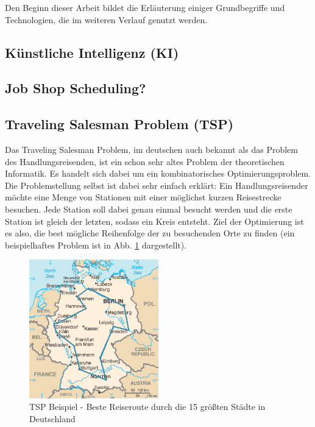 Den Beginn dieser Arbeit bildet die Erläuterung einiger Grundbegriffe und Technologien, die im weiteren Verlauf genutzt werden.

\subsection{Künstliche Intelligenz (KI)}
\label{section:ki}


\subsection{Job Shop Scheduling?}

\subsection{Traveling Salesman Problem (TSP)}
\label{sec:grundlagen_tsp}

Das Traveling Salesman Problem, im deutschen auch bekannt als das Problem des Handlungsreisenden, ist ein schon sehr altes Problem der theoretischen Informatik. Es handelt sich dabei um ein kombinatorisches Optimierungsproblem. Die Problemstellung selbst ist dabei sehr einfach erklärt: Ein Handlungsreisender möchte eine Menge von Stationen mit einer möglichst kurzen Reisestrecke besuchen. Jede Station soll dabei genau einmal besucht werden und die erste Station ist gleich der letzten, sodass ein Kreis entsteht. Ziel der Optimierung ist es also, die best mögliche Reihenfolge der zu besuchenden Orte zu finden (ein beispielhaftes Problem ist in Abb. \ref{fig:tsp_deutschland} dargestellt). \cite{travelingSalesman}

\begin{figure}[H]
    \centering
    \includegraphics[width=0.5\textwidth]{images/TSP_Deutschland_3.png}
    \caption{TSP Beispiel - Beste Reiseroute durch die 15 größten Städte in Deutschland \cite{tspDeutschland}}
    \label{fig:tsp_deutschland}
\end{figure}

